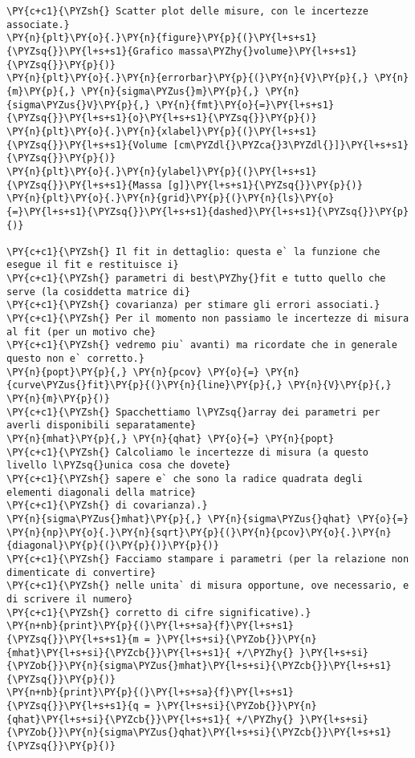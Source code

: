 \begin{Verbatim}[label=\makebox{\href{https://github.com/unipi-physics-labs/lab1-sheets/tree/main/snippy/dad_densita.py}{https://github.com/.../dad\_densita.py}},commandchars=\\\{\}]
\PY{c+c1}{\PYZsh{} Scatter plot delle misure, con le incertezze associate.}
\PY{n}{plt}\PY{o}{.}\PY{n}{figure}\PY{p}{(}\PY{l+s+s1}{\PYZsq{}}\PY{l+s+s1}{Grafico massa\PYZhy{}volume}\PY{l+s+s1}{\PYZsq{}}\PY{p}{)}
\PY{n}{plt}\PY{o}{.}\PY{n}{errorbar}\PY{p}{(}\PY{n}{V}\PY{p}{,} \PY{n}{m}\PY{p}{,} \PY{n}{sigma\PYZus{}m}\PY{p}{,} \PY{n}{sigma\PYZus{}V}\PY{p}{,} \PY{n}{fmt}\PY{o}{=}\PY{l+s+s1}{\PYZsq{}}\PY{l+s+s1}{o}\PY{l+s+s1}{\PYZsq{}}\PY{p}{)}
\PY{n}{plt}\PY{o}{.}\PY{n}{xlabel}\PY{p}{(}\PY{l+s+s1}{\PYZsq{}}\PY{l+s+s1}{Volume [cm\PYZdl{}\PYZca{}3\PYZdl{}]}\PY{l+s+s1}{\PYZsq{}}\PY{p}{)}
\PY{n}{plt}\PY{o}{.}\PY{n}{ylabel}\PY{p}{(}\PY{l+s+s1}{\PYZsq{}}\PY{l+s+s1}{Massa [g]}\PY{l+s+s1}{\PYZsq{}}\PY{p}{)}
\PY{n}{plt}\PY{o}{.}\PY{n}{grid}\PY{p}{(}\PY{n}{ls}\PY{o}{=}\PY{l+s+s1}{\PYZsq{}}\PY{l+s+s1}{dashed}\PY{l+s+s1}{\PYZsq{}}\PY{p}{)}

\PY{c+c1}{\PYZsh{} Il fit in dettaglio: questa e` la funzione che esegue il fit e restituisce i}
\PY{c+c1}{\PYZsh{} parametri di best\PYZhy{}fit e tutto quello che serve (la cosiddetta matrice di}
\PY{c+c1}{\PYZsh{} covarianza) per stimare gli errori associati.}
\PY{c+c1}{\PYZsh{} Per il momento non passiamo le incertezze di misura al fit (per un motivo che}
\PY{c+c1}{\PYZsh{} vedremo piu` avanti) ma ricordate che in generale questo non e` corretto.}
\PY{n}{popt}\PY{p}{,} \PY{n}{pcov} \PY{o}{=} \PY{n}{curve\PYZus{}fit}\PY{p}{(}\PY{n}{line}\PY{p}{,} \PY{n}{V}\PY{p}{,} \PY{n}{m}\PY{p}{)}
\PY{c+c1}{\PYZsh{} Spacchettiamo l\PYZsq{}array dei parametri per averli disponibili separatamente}
\PY{n}{mhat}\PY{p}{,} \PY{n}{qhat} \PY{o}{=} \PY{n}{popt}
\PY{c+c1}{\PYZsh{} Calcoliamo le incertezze di misura (a questo livello l\PYZsq{}unica cosa che dovete}
\PY{c+c1}{\PYZsh{} sapere e` che sono la radice quadrata degli elementi diagonali della matrice}
\PY{c+c1}{\PYZsh{} di covarianza).}
\PY{n}{sigma\PYZus{}mhat}\PY{p}{,} \PY{n}{sigma\PYZus{}qhat} \PY{o}{=} \PY{n}{np}\PY{o}{.}\PY{n}{sqrt}\PY{p}{(}\PY{n}{pcov}\PY{o}{.}\PY{n}{diagonal}\PY{p}{(}\PY{p}{)}\PY{p}{)}
\PY{c+c1}{\PYZsh{} Facciamo stampare i parametri (per la relazione non dimenticate di convertire}
\PY{c+c1}{\PYZsh{} nelle unita` di misura opportune, ove necessario, e di scrivere il numero}
\PY{c+c1}{\PYZsh{} corretto di cifre significative).}
\PY{n+nb}{print}\PY{p}{(}\PY{l+s+sa}{f}\PY{l+s+s1}{\PYZsq{}}\PY{l+s+s1}{m = }\PY{l+s+si}{\PYZob{}}\PY{n}{mhat}\PY{l+s+si}{\PYZcb{}}\PY{l+s+s1}{ +/\PYZhy{} }\PY{l+s+si}{\PYZob{}}\PY{n}{sigma\PYZus{}mhat}\PY{l+s+si}{\PYZcb{}}\PY{l+s+s1}{\PYZsq{}}\PY{p}{)}
\PY{n+nb}{print}\PY{p}{(}\PY{l+s+sa}{f}\PY{l+s+s1}{\PYZsq{}}\PY{l+s+s1}{q = }\PY{l+s+si}{\PYZob{}}\PY{n}{qhat}\PY{l+s+si}{\PYZcb{}}\PY{l+s+s1}{ +/\PYZhy{} }\PY{l+s+si}{\PYZob{}}\PY{n}{sigma\PYZus{}qhat}\PY{l+s+si}{\PYZcb{}}\PY{l+s+s1}{\PYZsq{}}\PY{p}{)}


\end{Verbatim}
